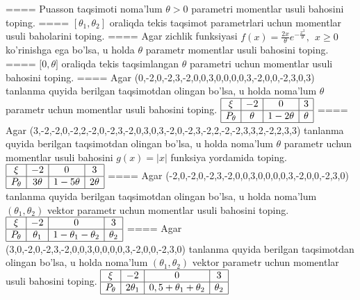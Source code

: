 ====
Puasson taqsimoti noma'lum \(\theta > 0\) parametri momentlar usuli bahosini toping.
====
\(\left\lbrack \theta_{1},\theta_{2} \right\rbrack\) oraliqda tekis taqsimot parametrlari uchun momentlar usuli baholarini toping.
====
Agar zichlik funksiyasi \(f(x) = \frac{2x}{\theta}e^{- \frac{x^{2}}{\theta}},\ \ x \geq 0\) ko'rinishga ega bo'lsa, u holda \(\theta\) parametr momentlar usuli bahosini toping.
====
\(\lbrack 0,\theta\rbrack\) oraliqda tekis taqsimlangan \(\theta\) parametri uchun momentlar usuli bahosini toping.
====
Agar (0,-2,0,-2,3,-2,0,0,3,0,0,0,0,3,-2,0,0,-2,3,0,3) tanlanma quyida berilgan taqsimotdan olingan bo'lsa, u holda noma'lum \(\theta\) parametr uchun momentlar usuli bahosini toping.
$\begin{array}{|c|c|c|c|}
    \hline
    \xi & - 2 & 0 & 3 \\
    \hline
    P_{\theta} & \theta & 1 - 2\theta & \theta \\
    \hline
\end{array}$
====
Agar (3,-2,-2,0,-2,2,-2,0,-2,3,-2,0,3,0,3,-2,0,-2,3,-2,2,-2,-2,3,3,2,-2,2,3,3) tanlanma quyida berilgan taqsimotdan olingan bo'lsa, u holda noma'lum \(\theta\) parametr uchun momentlar usuli bahosini \(g(x) = |x|\) funksiya yordamida toping.
$\begin{array}{|c|c|c|c|}
    \hline
    \xi & -2 & 0 & 3 \\
    \hline
    P_{\theta} & 3\theta & 1 - 5\theta & 2\theta \\
    \hline
\end{array}$
====
Agar (-2,0,-2,0,-2,3,-2,0,0,3,0,0,0,0,3,-2,0,0,-2,3,0) tanlanma quyida berilgan taqsimotdan olingan bo'lsa, u holda noma'lum \(\left( \theta_{1},\theta_{2} \right)\) vektor parametr uchun momentlar usuli bahosini toping.
$\begin{array}{|c|c|c|c|}
    \hline
    \xi & - 2 & 0 & 3\\
    \hline
    P_{\theta} & \theta_{1} & 1 - \theta_{1} - \theta_{2} & \theta_{2} \\
    \hline
\end{array}$
====
Agar (3,0,-2,0,-2,3,-2,0,0,3,0,0,0,0,3,-2,0,0,-2,3,0) tanlanma quyida berilgan taqsimotdan olingan bo'lsa, u holda noma'lum \(\left( \theta_{1},\theta_{2} \right)\) vektor parametr uchun momentlar usuli bahosini toping.
$\begin{array}{|c|c|c|c|}
    \hline
    \xi & - 2 & 0 & 3 \\
    \hline
    P_{\theta} & 2\theta_{1} & 0,5 + \theta_{1} + \theta_{2} & \theta_{2} \\
    \hline
\end{array}$
